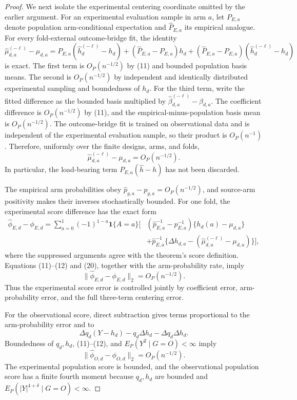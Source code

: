 \documentclass{article}
\begin{document}
\begin{proof}
We next isolate the experimental centering coordinate omitted by the earlier argument.  For an experimental evaluation sample in arm \(a\), let \(P_{E,a}\) denote population arm-conditional expectation and \(\widehat P_{E,a}\) its empirical analogue.  For every fold-external outcome-bridge fit, the identity
\[
 \widehat\mu_{d,a}^{(-\ell)}-\mu_{d,a}
 =P_{E,a}(\widehat h_d^{(-\ell)}-h_d)
 +(\widehat P_{E,a}-P_{E,a})h_d
 +(\widehat P_{E,a}-P_{E,a})(\widehat h_d^{(-\ell)}-h_d)    \tag{19}
\]
is exact.  The first term is \(O_P(n^{-1/2})\) by (11) and bounded population basis means.  The second is \(O_P(n^{-1/2})\) by independent and identically distributed experimental sampling and boundedness of \(h_d\).  For the third term, write the fitted difference as the bounded basis multiplied by \(\widehat\beta_{d,a}^{(-\ell)}-\beta_{d,a}\).  The coefficient difference is \(O_P(n^{-1/2})\) by (11), and the empirical-minus-population basis mean is \(O_P(n^{-1/2})\).  The outcome-bridge fit is trained on observational data and is independent of the experimental evaluation sample, so their product is \(O_P(n^{-1})\).  Therefore, uniformly over the finite designs, arms, and folds,
\[
 \widehat\mu_{d,a}^{(-\ell)}-\mu_{d,a}=O_P(n^{-1/2}).        \tag{20}
\]
In particular, the load-bearing term \(P_{E,a}(\widehat h-h)\) has not been discarded.

The empirical arm probabilities obey \(\widehat p_{g,a}-p_{g,a}=O_P(n^{-1/2})\), and source-arm positivity makes their inverses stochastically bounded.  For one fold, the experimental score difference has the exact form
\[
\begin{aligned}
 \widehat\phi_{E,d}-\phi_{E,d}
 =\sum_{a=0}^1(-1)^{1-a}\mathbf1\{A=a\}\bigg[&
 \left(\widehat p_{E,a}^{-1}-p_{E,a}^{-1}\right)
 \{h_d(a)-\mu_{d,a}\}\\
 &+\widehat p_{E,a}^{-1}
 \{\Delta h_{d,a}-(\widehat\mu_{d,a}^{(-\ell)}-\mu_{d,a})\}
 \bigg],                                                     \tag{21}
\end{aligned}
\]
where the suppressed arguments agree with the theorem's score definition.  Equations (11)--(12) and (20), together with the arm-probability rate, imply
\[
 \|\widehat\phi_{E,d}-\phi_{E,d}\|_2=O_P(n^{-1/2}).         \tag{22}
\]
Thus the experimental score error is controlled jointly by coefficient error, arm-probability error, and the full three-term centering error.

For the observational score, direct subtraction gives terms proportional to the arm-probability error and to
\[
 \Delta q_d(Y-h_d)-q_d\Delta h_d-\Delta q_d\Delta h_d.       \tag{23}
\]
Boundedness of \(q_d,h_d\), (11)--(12), and \(E_P(Y^2\mid G=O)<\infty\) imply
\[
 \|\widehat\phi_{O,d}-\phi_{O,d}\|_2=O_P(n^{-1/2}).         \tag{24}
\]
The experimental population score is bounded, and the observational population score has a finite fourth moment because \(q_d,h_d\) are bounded and \(E_P(|Y|^{4+\delta}\mid G=O)<\infty\).


\end{proof}
\end{document}
